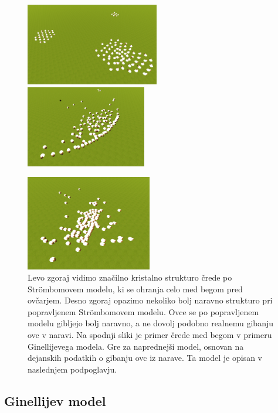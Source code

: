 \begin{figure}[ht]  %
	\centering
	\includegraphics[width=0.52\textwidth]{../poglavja/images/stroembom-creda.png}
	\includegraphics[width=0.47\textwidth]{../poglavja/images/popravljen-stroembom-creda.png}
	
	\includegraphics[width=0.49\textwidth]{../poglavja/images/ginelli-creda.png}
	\caption[Struktura črede po vseh treh modelih]{Levo zgoraj vidimo značilno kristalno strukturo črede po Str{\"o}mbomovem modelu, ki se ohranja celo med begom pred ovčarjem. Desno zgoraj opazimo nekoliko bolj naravno strukturo pri popravljenem Str{\"o}mbomovem modelu. Ovce se po popravljenem modelu gibljejo bolj naravno, a ne dovolj podobno realnemu gibanju ovc v naravi. Na spodnji sliki je primer črede med begom v primeru Ginellijevega modela. Gre za naprednejši model, osnovan na dejanskih podatkih o gibanju ovc iz narave. Ta model je opisan v naslednjem podpoglavju.} %
	\label{fig:stroembom-olje}
\end{figure}

\subsection{Ginellijev model}\label{ginelli}

